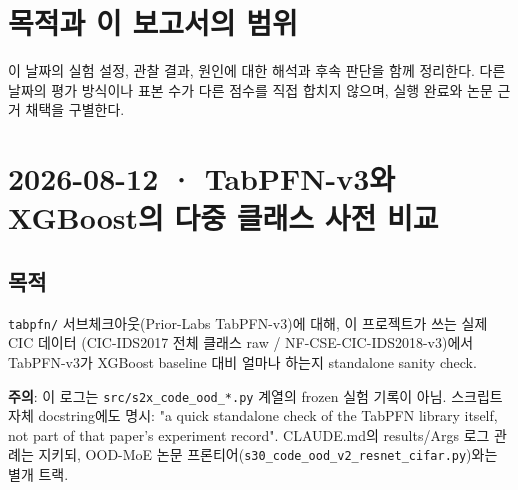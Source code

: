 




\section*{목적과 이 보고서의 범위}

이 날짜의 실험 설정, 관찰 결과, 원인에 대한 해석과 후속 판단을 함께 정리한다. 다른 날짜의 평가 방식이나 표본 수가 다른 점수를 직접 합치지 않으며, 실행 완료와 논문 근거 채택을 구별한다.


\section{2026-08-12 · TabPFN-v3와 XGBoost의 다중 클래스 사전 비교}
\label{report:20260812_0812}
\subsection{목적}
\par\noindent \textbullet\enspace \texttt{tabpfn/\allowbreak{}\allowbreak{}} 서브체크아웃(Prior-Labs TabPFN-v3)에 대해, 이 프로젝트가 쓰는 실제 CIC 데이터 (CIC-IDS2017 전체 클래스 raw /\allowbreak{} NF-CSE-CIC-IDS2018-v3)에서 TabPFN-v3가 XGBoost baseline 대비 얼마나 하는지 standalone sanity check.


\par\noindent \textbullet\enspace \textbf{주의}: 이 로그는 \texttt{src/\allowbreak{}\allowbreak{}s2x\_\allowbreak{}\allowbreak{}code\_\allowbreak{}\allowbreak{}ood\allowbreak{}\_\allowbreak{}\allowbreak{}*.\allowbreak{}py} 계열의 frozen 실험 기록이 아님. 스크립트 자체 docstring에도 명시: "a quick standalone check of the TabPFN library itself, not part of that paper's experiment record". CLAUDE.md의 results/\allowbreak{}Args 로그 관례는 지키되, OOD-MoE 논문 프론티어(\texttt{s30\_\allowbreak{}\allowbreak{}code\allowbreak{}\_\allowbreak{}\allowbreak{}ood\_\allowbreak{}\allowbreak{}v2\_\allowbreak{}\allowbreak{}resnet\_\allowbreak{}\allowbreak{}c\allowbreak{}ifar.\allowbreak{}py})와는 별개 트랙.


